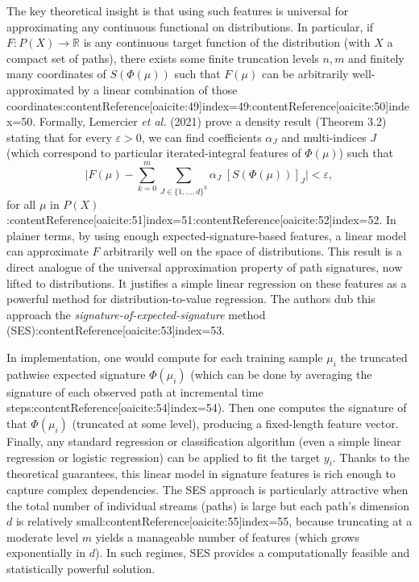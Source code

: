 \documentclass[11pt]{article}
\begin{document}
The key theoretical insight is that using such features is universal for approximating any continuous functional on distributions. In particular, if $F: P(X)\to \mathbb{R}$ is any continuous target function of the distribution (with $X$ a compact set of paths), there exists some finite truncation levels $n,m$ and finitely many coordinates of $S(\Phi(\mu))$ such that $F(\mu)$ can be arbitrarily well-approximated by a linear combination of those coordinates:contentReference[oaicite:49]{index=49}:contentReference[oaicite:50]{index=50}. Formally, Lemercier \emph{et al.} (2021) prove a density result (Theorem 3.2) stating that for every $\varepsilon>0$, we can find coefficients $\alpha_J$ and multi-indices $J$ (which correspond to particular iterated-integral features of $\Phi(\mu)$) such that 
\[
\Big|F(\mu) - \sum_{k=0}^{m}\sum_{J \in \{1,\dots,d\}^k} \alpha_J\; [S(\Phi(\mu))]_{J}\Big| < \varepsilon,
\] 
for all $\mu$ in $P(X)$:contentReference[oaicite:51]{index=51}:contentReference[oaicite:52]{index=52}. In plainer terms, by using enough expected-signature-based features, a linear model can approximate $F$ arbitrarily well on the space of distributions. This result is a direct analogue of the universal approximation property of path signatures, now lifted to distributions. It justifies a simple linear regression on these features as a powerful method for distribution-to-value regression. The authors dub this approach the \emph{signature-of-expected-signature} method (SES):contentReference[oaicite:53]{index=53}.

In implementation, one would compute for each training sample $\mu_i$ the truncated pathwise expected signature $\Phi(\mu_i)$ (which can be done by averaging the signature of each observed path at incremental time steps:contentReference[oaicite:54]{index=54}). Then one computes the signature of that $\Phi(\mu_i)$ (truncated at some level), producing a fixed-length feature vector. Finally, any standard regression or classification algorithm (even a simple linear regression or logistic regression) can be applied to fit the target $y_i$. Thanks to the theoretical guarantees, this linear model in signature features is rich enough to capture complex dependencies. The SES approach is particularly attractive when the total number of individual streams (paths) is large but each path’s dimension $d$ is relatively small:contentReference[oaicite:55]{index=55}, because truncating at a moderate level $m$ yields a manageable number of features (which grows exponentially in $d$). In such regimes, SES provides a computationally feasible and statistically powerful solution.
\end{document}

